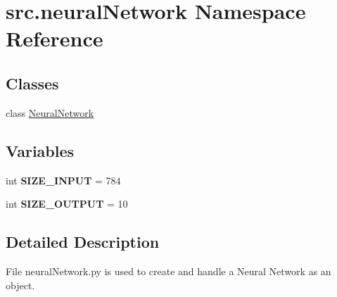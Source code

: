 \hypertarget{namespacesrc_1_1neuralNetwork}{}\section{src.\+neural\+Network Namespace Reference}
\label{namespacesrc_1_1neuralNetwork}
\subsection*{Classes}
\begin{DoxyCompactItemize}
\item 
class \hyperlink{classsrc_1_1neuralNetwork_1_1NeuralNetwork}{Neural\+Network}
\end{DoxyCompactItemize}
\subsection*{Variables}
\begin{DoxyCompactItemize}
\item 
int {\bfseries S\+I\+Z\+E\+\_\+\+I\+N\+P\+UT} = 784\hypertarget{namespacesrc_1_1neuralNetwork_aa46787bfc077a6e276591a199d67a907}{}\label{namespacesrc_1_1neuralNetwork_aa46787bfc077a6e276591a199d67a907}

\item 
int {\bfseries S\+I\+Z\+E\+\_\+\+O\+U\+T\+P\+UT} = 10\hypertarget{namespacesrc_1_1neuralNetwork_a15c79f6a744d306bd0cd05030a7c3f18}{}\label{namespacesrc_1_1neuralNetwork_a15c79f6a744d306bd0cd05030a7c3f18}

\end{DoxyCompactItemize}


\subsection{Detailed Description}
\begin{DoxyVerb}    File neuralNetwork.py is used to create and handle a Neural Network
    as an object.
\end{DoxyVerb}
 